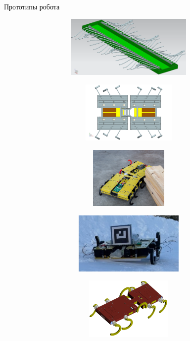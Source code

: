 \documentclass[aspectratio=169,xcolor=table,10pt]{beamer}
\begin{document}
\begin{frame}[c]{Прототипы робота}
    \begin{figure}[H]
        \begin{subfigure}{0.32\textwidth}
            \centering\includegraphics[height=3cm,width=1\textwidth,keepaspectratio]{strirus_0.png}
        \end{subfigure}
        \begin{subfigure}{0.32\textwidth}
            \centering\includegraphics[height=3cm,width=1\textwidth,keepaspectratio]{strirus_1.png}
        \end{subfigure}
        \begin{subfigure}{0.32\textwidth}
            \centering\includegraphics[height=3cm,width=1\textwidth,keepaspectratio]{strirus_2.jpg}
        \end{subfigure}

        \begin{subfigure}{0.32\textwidth}
            \centering\includegraphics[height=3cm,width=1\textwidth,keepaspectratio]{strirus_3_snow.jpg}
        \end{subfigure}
        \begin{subfigure}{0.32\textwidth}
            \centering\includegraphics[height=3cm,width=1\textwidth,keepaspectratio]{strirus_4.png}
        \end{subfigure}
    \end{figure}
\end{frame}
\end{document}
